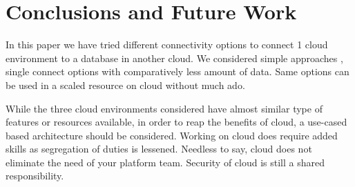 \documentclass[journal]{hybrid-cloud}
\begin{document}
%






\section{Conclusions and Future Work}
In this paper we have tried different connectivity options to connect 1 cloud environment to a database in another cloud. We considered simple approaches , single connect options with comparatively less amount of data. Same options can be used in a scaled resource on cloud without much ado.

While the three cloud environments considered have almost similar type of features or resources available, in order to reap the benefits of cloud, a use-cased based architecture should be considered. Working on cloud does require added skills as segregation of duties is lessened. Needless to say, cloud does not eliminate the need of your platform team. Security of cloud is still a shared responsibility. 
\end{document}
